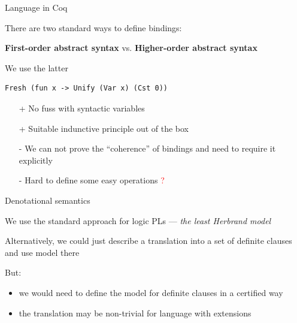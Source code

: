 \documentclass{beamer}
\theoremstyle{definition}
\theoremstyle{plain} %
\begin{document}
\begin{frame}[fragile]{Language in Coq}

There are two standard ways to define bindings:

\textbf{First-order abstract syntax} vs. \textbf{Higher-order abstract syntax}

\vskip5mm

We use the latter

\begin{lstlisting}
Fresh (fun x -> Unify (Var x) (Cst 0))
\end{lstlisting}

\vskip5mm

\begin{itemize}
\item[+] No fuss with syntactic variables
\item[+] Suitable indunctive principle out of the box
\item[-] We can not prove the ``coherence'' of bindings and need to require it explicitly
\item[-] Hard to define some easy operations \textcolor{red}{?}
\end{itemize}

\end{frame}



\begin{frame}{Denotational semantics}

We use the standard approach for logic PLs --- \emph{the least Herbrand model}

\vskip10mm

Alternatively, we could just describe a translation into a set of definite clauses and use model there

\vskip5mm

But:

\begin{itemize}
\item we would need to define the model for definite clauses in a certified way
\item the translation may be non-trivial for language with extensions
\end{itemize}

\end{frame}
\end{document}
